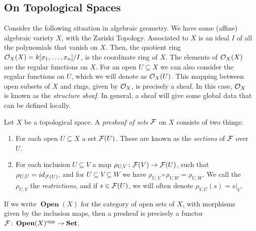 \documentclass{article}
\DeclareMathOperator{\Open}{\mathbf{Open}}
\DeclareMathOperator{\opp}{opp}
\begin{document}
\subsection{On Topological Spaces}
Consider the following situation in algebraic geometry.
We have some (affine) algebraic variety $X$, with the Zariski Topology.
Associated to $X$ is an ideal $I$ of all the polynomials that vanish
on $X$. Then, the quotient ring $\mathcal{O}_X(X) = k[x_1,\ldots,x_n]/I$, is
the coordinate ring of $X$. The elements of $\mathcal{O}_X(X)$ are the regular
functions on $X$. For an open $U\subseteq X$ we can also consider the
regular functions on $U$, which we will denote as $\mathcal{O}_X(U)$.
This mapping between open subsets of $X$ and rings,
given by $\mathcal{O}_X$, is precisely a sheaf.
In this case, $\mathcal{O}_X$ is known as the \emph{structure sheaf}.
In general, a sheaf will give some global data that can be defined
locally.
\begin{definition}[Presheaves]
    Let $X$ be a topological space.
    A \emph{presheaf of sets} $\mathcal{F}$ on $X$ consists of two things:
    \begin{enumerate}
        \item For each open $U\subseteq X$ a set $\mathcal{F}(U)$.
              These are known as the \emph{sections} of $\mathcal{F}$ over $U$.
        \item For each inclusion $U\subseteq V$ a map
              $\rho_{U,V}\colon \mathcal{F}(V) \to \mathcal{F}(U)$, such that $\rho_{U,U} = id_{\mathcal{F}(U)}$, and
              for $U\subseteq V \subseteq W$ we have $\rho_{U,V}\circ \rho_{V,W} = \rho_{U, W}$.
              We call the $\rho_{U,V}$ the \emph{restrictions}, and if $s\in \mathcal{F}(U)$,
              we will often denote $\rho_{V,U}(s) = s|_V$.
    \end{enumerate}
\end{definition}
\begin{remark}
    If we write $\Open(X)$ for the category of open sets of $X$,
    with morphisms given by the inclusion maps, then a presheaf is
    precisely a functor $\mcF\colon \Open(X)^{\opp} \to \Set$.
\end{remark}
\end{document}
